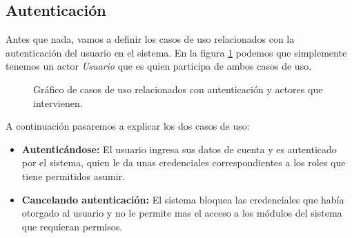 \subsection{Autenticación}
\label{sec:casosuso_autenticacion}

\par Antes que nada, vamos a definir los casos de uso relacionados con la autenticación del usuario en el sistema. En la figura \ref{fig:casosuso_autenticacion} podemos que simplemente tenemos un actor \textit{Usuario} que es quien participa de ambos casos de uso.

\begin{figure}[ht]
  \center
  \caption{Gráfico de casos de uso relacionados con autenticación y actores que intervienen.}
  \label{fig:casosuso_autenticacion}
\end{figure}

\par A continuación pasaremos a explicar los dos casos de uso:
\begin{itemize}
  \item \textbf{Autenticándose:} El usuario ingresa sus datos de cuenta y es autenticado por el sistema, quien le da unas credenciales correspondientes a los roles que tiene permitidos asumir.
  \item \textbf{Cancelando autenticación:} El sistema bloquea las credenciales que había otorgado al usuario y no le permite mas el acceso a los módulos del sistema que requieran permisos.
\end{itemize}
